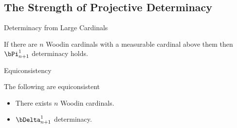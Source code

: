 \documentclass{beamer}
\begin{document}
\subsection{The Strength of Projective Determinacy}

\begin{frame}{Determinacy from Large Cardinals}
\begin{theorem}
If there are $n$ Woodin cardinals with a measurable cardinal above them then $\bPi^1_{n+1}$ determinacy holds.
\end{theorem}
\end{frame}

\begin{frame}{Equiconsistency}
\begin{theorem}
The following are equiconsistent
\begin{itemize}
  \item There exists $n$ Woodin cardinals.
  \item $\bDelta^1_{n+1}$ determinacy.
\end{itemize}
\end{theorem}
\end{frame}
\end{document}
